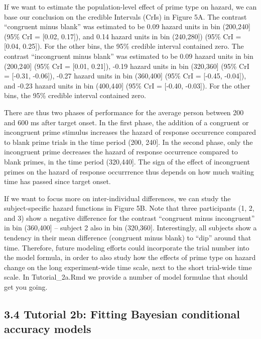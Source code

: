 \documentclass[
  man, donotrepeattitle,floatsintext]{apa6}
\begin{document}
If we want to estimate the population-level effect of prime type on hazard, we can base our conclusion on the credible Intervals (CrIs) in Figure 5A. The contrast ``congruent minus blank'' was estimated to be 0.09 hazard units in bin (200,240{]} (95\% CrI = {[}0.02, 0.17{]}), and 0.14 hazard units in bin (240,280{]}) (95\% CrI = {[}0.04, 0.25{]}). For the other bins, the 95\% credible interval contained zero.
The contrast ``incongruent minus blank'' was estimated to be 0.09 hazard units in bin (200,240{]} (95\% CrI = {[}0.01, 0.21{]}), -0.19 hazard units in bin (320,360{]} (95\% CrI = {[}-0.31, -0.06{]}), -0.27 hazard units in bin (360,400{]} (95\% CrI = {[}-0.45, -0.04{]}), and -0.23 hazard units in bin (400,440{]} (95\% CrI = {[}-0.40, -0.03{]}). For the other bins, the 95\% credible interval contained zero.

There are thus two phases of performance for the average person between 200 and 600 ms after target onset. In the first phase, the addition of a congruent or incongruent prime stimulus increases the hazard of response occurrence compared to blank prime trials in the time period (200, 240{]}. In the second phase, only the incongruent prime decreases the hazard of response occurrence compared to blank primes, in the time period (320,440{]}. The sign of the effect of incongruent primes on the hazard of response occurrrence thus depends on how much waiting time has passed since target onset.

If we want to focus more on inter-individual differences, we can study the subject-specific hazard functions in Figure 5B. Note that three participants (1, 2, and 3) show a negative difference for the contrast ``congruent minus incongruent'' in bin (360,400{]} -- subject 2 also in bin (320,360{]}. Interestingly, all subjects show a tendency in their mean difference (congruent minus blank) to ``dip'' around that time. Therefore, future modeling efforts could incorporate the trial number into the model formula, in order to also study how the effects of prime type on hazard change on the long experiment-wide time scale, next to the short trial-wide time scale. In Tutorial\_2a.Rmd we provide a number of model formulae that should get you going.

\subsection{3.4 Tutorial 2b: Fitting Bayesian conditional accuracy models}\label{tutorial-2b-fitting-bayesian-conditional-accuracy-models}
\end{document}
